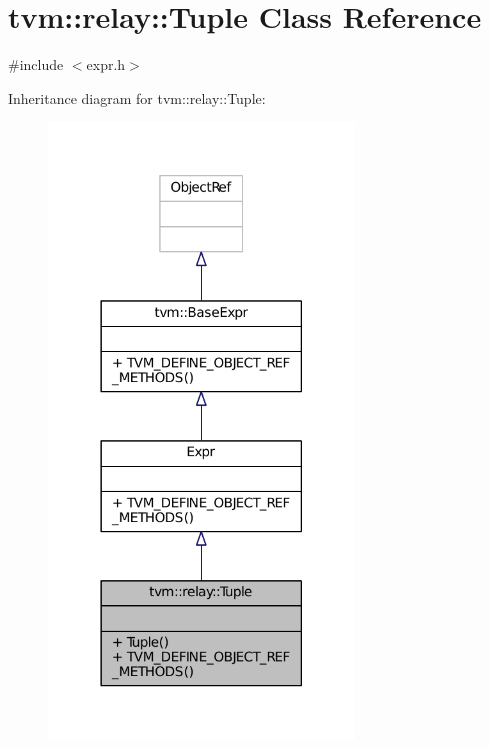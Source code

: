 \hypertarget{classtvm_1_1relay_1_1Tuple}{}\section{tvm\+:\+:relay\+:\+:Tuple Class Reference}
\label{classtvm_1_1relay_1_1Tuple}


{\ttfamily \#include $<$expr.\+h$>$}



Inheritance diagram for tvm\+:\+:relay\+:\+:Tuple\+:
\nopagebreak
\begin{figure}[H]
\begin{center}
\leavevmode
\includegraphics[width=230pt]{classtvm_1_1relay_1_1Tuple__inherit__graph}
\end{center}
\end{figure}


